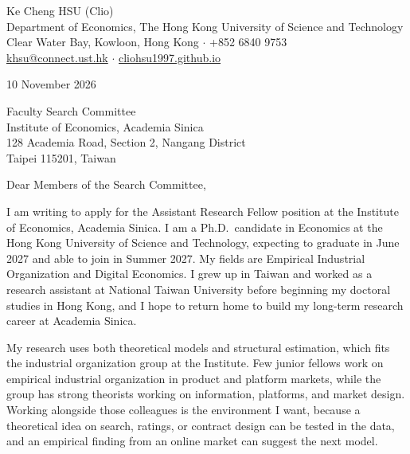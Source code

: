 \documentclass[11pt]{article}
\begin{document}
\begin{flushleft}
Ke Cheng HSU (Clio) \\
Department of Economics, The Hong Kong University of Science and Technology \\
Clear Water Bay, Kowloon, Hong Kong $\cdot$ +852 6840 9753 \\
\href{mailto:khsu@connect.ust.hk}{khsu@connect.ust.hk} $\cdot$ \href{https://cliohsu1997.github.io/}{cliohsu1997.github.io}
\end{flushleft}

10 November 2026

\vspace{0.15em}
Faculty Search Committee \\
Institute of Economics, Academia Sinica \\
128 Academia Road, Section 2, Nangang District \\
Taipei 115201, Taiwan

\vspace{0.15em}
Dear Members of the Search Committee,

I am writing to apply for the Assistant Research Fellow position at the Institute of Economics, Academia Sinica. I am a Ph.D.\ candidate in Economics at the Hong Kong University of Science and Technology, expecting to graduate in June 2027 and able to join in Summer 2027. My fields are Empirical Industrial Organization and Digital Economics. I grew up in Taiwan and worked as a research assistant at National Taiwan University before beginning my doctoral studies in Hong Kong, and I hope to return home to build my long-term research career at Academia Sinica.

My research uses both theoretical models and structural estimation, which fits the industrial organization group at the Institute. Few junior fellows work on empirical industrial organization in product and platform markets, while the group has strong theorists working on information, platforms, and market design. Working alongside those colleagues is the environment I want, because a theoretical idea on search, ratings, or contract design can be tested in the data, and an empirical finding from an online market can suggest the next model.
\end{document}

